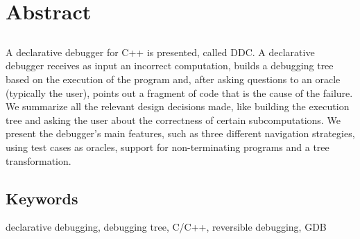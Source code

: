 \chapter*{Abstract}

\section*{\tituloPortadaEngVal}

A declarative debugger for C++ is presented, called DDC. A declarative debugger receives as input an incorrect computation, builds a debugging tree based on the execution of the program and, after asking questions to an oracle (typically the user), points out a fragment of code that is the cause of the failure. We summarize all the relevant design decisions made, like building the execution tree and asking the user about the correctness of certain subcomputations. We present the debugger’s main features, such as three different navigation strategies, using test cases as oracles, support for non-terminating programs and a tree transformation.

\section*{Keywords}

\noindent declarative debugging, debugging tree, C/C++, reversible debugging, GDB



